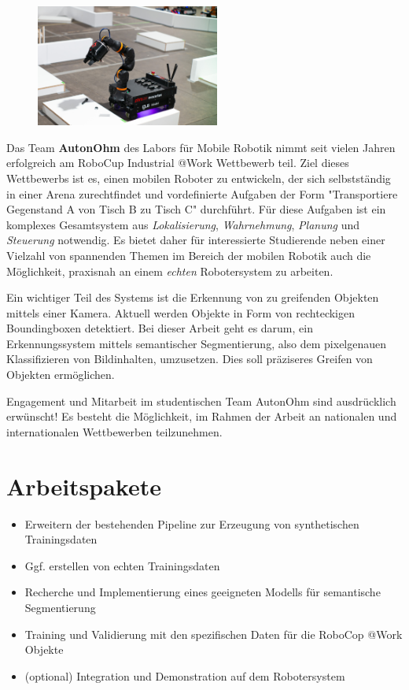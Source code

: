\documentclass{ohm_project_description}
\begin{document}
\maketitle
\thispagestyle{fancy}

\vspace*{-2.5cm}
\begin{figure}[h!]
    \centering
    \includegraphics[height=4cm]{img/atwork.jpg}
\end{figure} 


Das Team \textbf{AutonOhm} des Labors für Mobile Robotik nimmt seit vielen Jahren erfolgreich am RoboCup Industrial @Work Wettbewerb teil. Ziel dieses Wettbewerbs ist es, einen mobilen Roboter zu entwickeln, der sich selbstständig in einer Arena zurechtfindet und vordefinierte Aufgaben der Form "Transportiere Gegenstand A von Tisch B zu Tisch C" durchführt. Für diese Aufgaben ist ein komplexes Gesamtsystem aus \emph{Lokalisierung}, \emph{Wahrnehmung}, \emph{Planung} und \emph{Steuerung} notwendig. Es bietet daher für interessierte Studierende neben einer Vielzahl von spannenden Themen im Bereich der mobilen Robotik auch die Möglichkeit, praxisnah an einem \emph{echten} Robotersystem zu arbeiten.

Ein wichtiger Teil des Systems ist die Erkennung von zu greifenden Objekten mittels einer Kamera. Aktuell werden Objekte in Form von rechteckigen Boundingboxen detektiert. Bei dieser Arbeit geht es darum, ein Erkennungssystem mittels semantischer Segmentierung, also dem pixelgenauen Klassifizieren von Bildinhalten, umzusetzen. Dies soll präziseres Greifen von Objekten ermöglichen. 

Engagement und Mitarbeit im studentischen Team AutonOhm sind ausdrücklich erwünscht! Es besteht die Möglichkeit, im Rahmen der Arbeit an nationalen und internationalen Wettbewerben teilzunehmen.

\section*{Arbeitspakete}
\begin{itemize}[leftmargin=0.5cm]
    \setlength\itemsep{.1em}
    \item Erweitern der bestehenden Pipeline zur Erzeugung von synthetischen Trainingsdaten
    \item Ggf. erstellen von echten Trainingsdaten
    \item Recherche und Implementierung eines geeigneten Modells für semantische Segmentierung 
    \item Training und Validierung mit den spezifischen Daten für die RoboCop @Work Objekte
    \item (optional) Integration und Demonstration auf dem Robotersystem 
\end{itemize}
\end{document}
